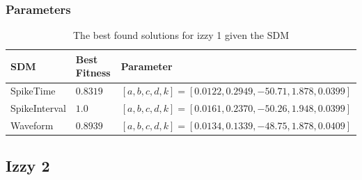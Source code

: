 \documentclass[10pt]{article}
\begin{document}
		\subsubsection{Parameters}
			\begin{table}[H]
				\begin{tabular}{lll}
					SDM & Best Fitness & Parameter\\\hline\hline
					SpikeTime & $0.8319$ & $[a,b,c,d,k]= [0.0122,0.2949, -50.71, 1.878, 0.0399]$\\
					SpikeInterval & $1.0$ & $[a,b,c,d,k]= [0.0161,0.2370, -50.26, 1.948, 0.0399]$\\
					Waveform & $0.8939$ & $[a,b,c,d,k]= [0.0134,0.1339, -48.75, 1.878, 0.0409]$\\
				\end{tabular}
				\caption{The best found solutions for izzy 1 given the SDM}
			\end{table}
		
	\subsection{Izzy 2}
\end{document}
